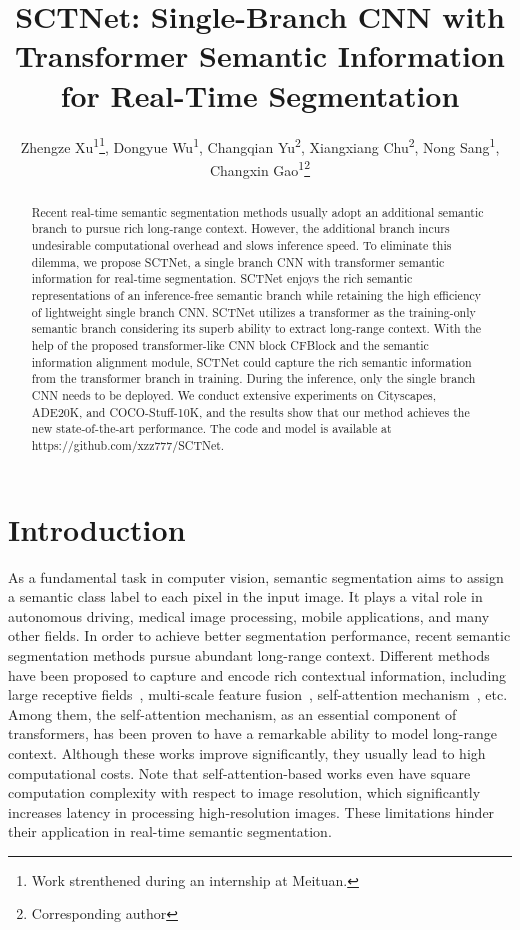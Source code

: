 \documentclass[letterpaper]{article} %
\title{SCTNet: Single-Branch CNN with Transformer Semantic Information for Real-Time Segmentation}
\author{
    Zhengze Xu\textsuperscript{\rm 1}\thanks{Work strenthened during an internship at Meituan.}, Dongyue Wu\textsuperscript{\rm 1}, Changqian Yu\textsuperscript{\rm 2}, Xiangxiang Chu\textsuperscript{\rm 2}, Nong Sang\textsuperscript{\rm 1}, Changxin Gao\textsuperscript{\rm 1}\thanks{Corresponding author}
}
\begin{document}
\maketitle

\begin{abstract}
Recent real-time semantic segmentation methods usually adopt an additional semantic branch to pursue rich long-range context. However, the additional branch incurs undesirable computational overhead and slows inference speed. 
To eliminate this dilemma, we propose SCTNet, a single branch CNN with transformer semantic information for real-time segmentation. SCTNet enjoys the rich semantic representations of an inference-free semantic branch while retaining the high efficiency of lightweight single branch CNN.
SCTNet utilizes a transformer as the training-only semantic branch considering its superb ability to extract long-range context. With the help of the proposed transformer-like CNN block CFBlock and the semantic information alignment module, SCTNet could capture the rich semantic information from the transformer branch in training. During the inference, only the single branch CNN needs to be deployed. We conduct extensive experiments on Cityscapes, ADE20K, and COCO-Stuff-10K, and the results show that our method achieves the new state-of-the-art performance. The code and model is available at https://github.com/xzz777/SCTNet.
\end{abstract}

\section{Introduction}
As a fundamental task in computer vision, semantic segmentation aims to assign a semantic class label to each pixel in the input image. It plays a vital role in autonomous driving, medical image processing, mobile applications, and many other fields. In order to achieve better segmentation performance, recent semantic segmentation methods pursue abundant long-range context. Different methods have been proposed to capture and encode rich contextual information, including large receptive fields~\cite{chen2014semantic,chen2017deeplab,chen2018encoder}, multi-scale feature fusion~\cite{ronneberger2015u,zhao2017pyramid}, self-attention mechanism~\cite{fu2019dual,huang2019ccnet,yuan2018ocnet,zhao2018psanet,dosovitskiy2020image}, etc. Among them, the self-attention mechanism, as an essential component of transformers, has been proven to have a remarkable ability to model long-range context. Although these works improve significantly, they usually lead to high computational costs. Note that self-attention-based works even have square computation complexity with respect to image resolution, which significantly increases latency in processing high-resolution images. These limitations hinder their application in real-time semantic segmentation.
\end{document}
